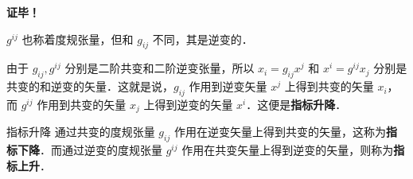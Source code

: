 \textbf{证毕！}

$g^{ij}$ 也称着度规张量，但和 $g_{ij}$ 不同，其是逆变的．

由于 $g_{ij},g^{ij}$ 分别是二阶共变和二阶逆变张量，所以 $x_i=g_{ij}x^j$ 和 $x^i=g^{ij}x_j$ 分别是共变的和逆变的矢量．这就是说，$g_{ij}$ 作用到逆变矢量 $x^j$ 上得到共变的矢量 $x_i$，而 $g^{ij}$ 作用到共变的矢量 $x_j$ 上得到逆变的矢量 $x^i$．这便是\textbf{指标升降}．
\begin{definition}{指标升降}
通过共变的度规张量 $g_{ij}$ 作用在逆变矢量上得到共变的矢量，这称为\textbf{指标下降}．而通过逆变的度规张量 $g^{ij}$ 作用在共变矢量上得到逆变的矢量，则称为\textbf{指标上升}．
\end{definition}